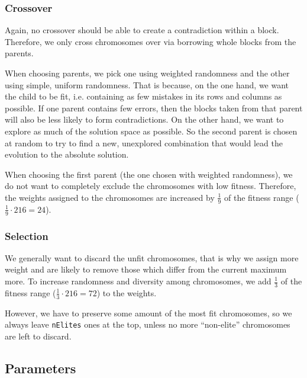 \documentclass[10pt]{article}
\begin{document}
\subsubsection{Crossover}
Again, no crossover should be able to create a contradiction within a block. Therefore,
we only cross chromosomes over via borrowing whole blocks from the parents.

When choosing parents, we pick one using weighted randomness and the other using
simple, uniform randomness. That is because, on the one hand, we want the child
to be fit, i.e. containing as few mistakes in its rows and columns as possible.
If one parent contains few errors, then the blocks taken from that parent will also
be less likely to form contradictions.
On the other hand, we want to explore as much of the solution space as possible.
So the second parent is chosen at random to try to find a new, unexplored combination
that would lead the evolution to the absolute solution.

When choosing the first parent (the one chosen with weighted randomness), we do
not want to completely exclude the chromosomes with low fitness. Therefore, the
weights assigned to the chromosomes are increased by $\frac19$ of the fitness range ($\frac19\cdot216=24$).

\subsubsection{Selection}
We generally want to discard the unfit chromosomes, that is why we assign more
weight and are likely to remove those which differ from the current maximum more.
To increase randomness and diversity among chromosomes, we add $\frac13$ of the
fitness range ($\frac13\cdot216=72$) to the weights.

However, we have to preserve some amount of the most fit chromosomes, so we always
leave \texttt{nElites} ones at the top, unless no more ``non-elite'' chromosomes
are left to discard.

\subsection{Parameters}
\end{document}
